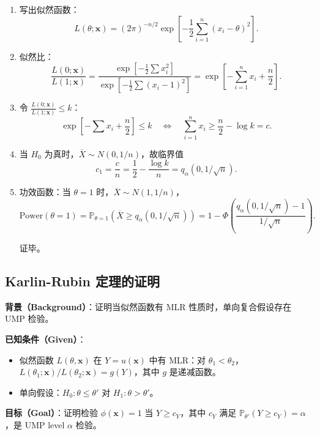 \begin{enumerate}
\item 写出似然函数：
\[
L(\theta; \mathbf{x}) = (2\pi)^{-n/2} \exp\left[-\frac{1}{2}\sum_{i=1}^n (x_i - \theta)^2\right].
\]

\item 似然比：
\[
\frac{L(0; \mathbf{x})}{L(1; \mathbf{x})} = \frac{\exp\left[-\frac{1}{2}\sum x_i^2\right]}{\exp\left[-\frac{1}{2}\sum (x_i-1)^2\right]} = \exp\left[-\sum_{i=1}^n x_i + \frac{n}{2}\right].
\]

\item 令 $\frac{L(0; \mathbf{x})}{L(1; \mathbf{x})} \leq k$：
\[
\exp\left[-\sum x_i + \frac{n}{2}\right] \leq k \quad \Longleftrightarrow \quad \sum_{i=1}^n x_i \geq \frac{n}{2} - \log k = c.
\]

\item 当 $H_0$ 为真时，$\overline{X} \sim N(0, 1/n)$，故临界值
\[
c_1 = \frac{c}{n} = \frac{1}{2} - \frac{\log k}{n} = q_{\alpha}(0, 1/\sqrt{n}).
\]

\item 功效函数：当 $\theta = 1$ 时，$\overline{X} \sim N(1, 1/n)$，
\[
\text{Power}(\theta=1) = \mathbb{P}_{\theta=1}\left(\overline{X} \geq q_{\alpha}(0, 1/\sqrt{n})\right) = 1 - \Phi\left(\frac{q_{\alpha}(0, 1/\sqrt{n}) - 1}{1/\sqrt{n}}\right).
\]

证毕。
\end{enumerate}

\subsection{Karlin-Rubin 定理的证明}\label{sec:karlin-rubin-proof}

\textbf{背景（Background）}：证明当似然函数有 MLR 性质时，单向复合假设存在 UMP 检验。

\textbf{已知条件（Given）}：
\begin{itemize}
\item 似然函数 $L(\theta, \mathbf{x})$ 在 $Y = u(\mathbf{x})$ 中有 MLR：对 $\theta_1 < \theta_2$，$L(\theta_1;\mathbf{x})/L(\theta_2;\mathbf{x}) = g(Y)$，其中 $g$ 是递减函数。
\item 单向假设：$H_0: \theta \leq \theta'$ 对 $H_1: \theta > \theta'$。
\end{itemize}

\textbf{目标（Goal）}：证明检验 $\phi(\mathbf{x}) = 1$ 当 $Y \geq c_Y$，其中 $c_Y$ 满足 $\mathbb{P}_{\theta'}(Y \geq c_Y) = \alpha$，是 UMP level $\alpha$ 检验。

